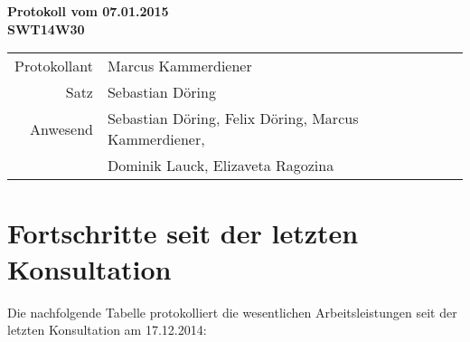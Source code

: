 \documentclass{scrartcl}
\begin{document}
\begin{center}
\LARGE \bf{Protokoll vom 07.01.2015 \\
SWT14W30}
\end{center}

\begin{tabular}{rp{10cm}}
Protokollant & Marcus Kammerdiener \\
Satz & Sebastian Döring \\
Anwesend & Sebastian Döring, Felix Döring, Marcus Kammerdiener,\\
& Dominik Lauck, Elizaveta Ragozina \\
\end{tabular}

\vspace*{3em}

\section{Fortschritte seit der letzten Konsultation}
Die nachfolgende Tabelle protokolliert die wesentlichen Arbeitsleistungen seit der letzten Konsultation am 17.12.2014:\\[.4cm]
\renewcommand{\arraystretch}{2}
\end{document}
